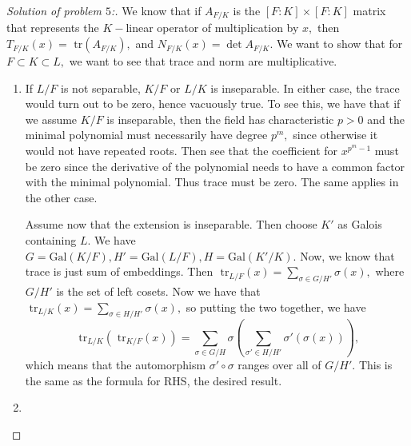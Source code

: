 \documentclass[letterpaper,11pt,twoside]{article}
\theoremstyle{proposition}
\theoremstyle{definition}
\theoremstyle{theorem}
\theoremstyle{definition}
\theoremstyle{definition}
\theoremstyle{definition}
\theoremstyle{lemma}
\theoremstyle{definition}
\theoremstyle{definition}
\theoremstyle{corollary}
\theoremstyle{definition}
\theoremstyle{definition}
\theoremstyle{definition}
\begin{document}
	\begin{proof}[Solution of problem $5$:]
		We know that if $A_{F/K}$ is the $[F:K] \times [F:K]$ matrix that represents the $K-$linear operator of multiplication by $x,$ then $T_{F/K}(x)= 
		\text{ tr}(A_{F/K}),$ and $N_{F/K}(x)= \det A_{F/K}.$ We want to show that for $ F \subset K \subset L,$ we want to see that trace and norm are 
		multiplicative.
	\begin{enumerate}
		\item If $L/F$ is not separable, $K/F$ or $L/K$ is inseparable. In either case, the trace would turn out to be zero, hence vacuously true. To see 
		this, we have that if we assume $K/F$ is inseparable, then the field has characteristic $p > 0$ and the minimal polynomial must necessarily have 
		degree $p^m,$ since otherwise it would not have repeated roots. Then see that the coefficient for $x^{p^m-1}$ must be zero since the derivative of 
		the polynomial needs to have a common factor with the minimal polynomial. Thus trace must be zero. The same applies in the other case.
		
		Assume now that the extension is inseparable. Then choose $K'$ as Galois containing $L.$ We have $G= \text{Gal}(K/F), H'= \text{Gal}(L/F), H= 
		\text{Gal}(K'/K).$ Now, we know that trace is just sum of embeddings. Then $  \text{ tr}_{L/F}(x)= \sum_{\sigma \in G/H'}\sigma(x),$
		where $G/H'$ is the set of left cosets. Now we have that $ \text{ tr}_{L/K}(x)= \sum_{\sigma \in H/H'}\sigma(x),$ so putting the two together, we 
		have 
		$$ \text{ tr}_{L/K}( \text{ tr}_{K/F}(x))= \sum_{\sigma \in G/H} \sigma \left( \sum_{\sigma' \in H/H'} \sigma'(\sigma(x)) \right),$$ which means 
		that the automorphism $\sigma' \circ \sigma $ ranges over all of $G/H'.$ This is the same as the formula for RHS, the desired result.
		
		\item  
	\end{enumerate}
\end{proof}
\end{document}
